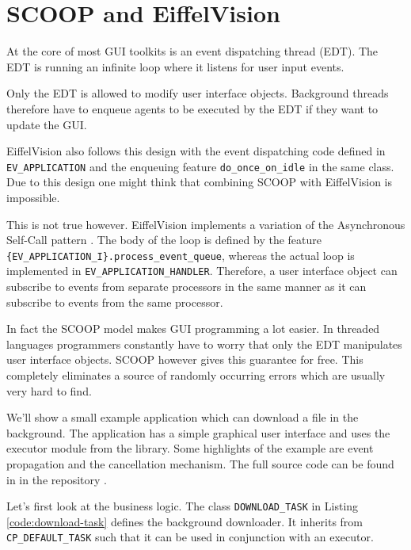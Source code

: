 \section{SCOOP and EiffelVision}

At the core of most GUI toolkits is an event dispatching thread (EDT).
The EDT is running an infinite loop where it listens for user input events.

Only the EDT is allowed to modify user interface objects.
Background threads therefore have to enqueue agents to be executed by the EDT if they want to update the GUI.

EiffelVision also follows this design with the event dispatching code defined in \lstinline!EV_APPLICATION! and the enqueuing feature \lstinline!do_once_on_idle! in the same class.
Due to this design one might think that combining SCOOP with EiffelVision is impossible.

This is not true however.
EiffelVision implements a variation of the Asynchronous Self-Call pattern .
The body of the loop is defined by the feature \lstinline!{EV_APPLICATION_I}.process_event_queue!, whereas the actual loop is implemented in \lstinline!EV_APPLICATION_HANDLER!.
Therefore, a user interface object can subscribe to events from separate processors in the same manner as it can subscribe to events from the same processor.

In fact the SCOOP model makes GUI programming a lot easier.
In threaded languages programmers constantly have to worry that only the EDT manipulates user interface objects.
SCOOP however gives this guarantee for free.
This completely eliminates a source of randomly occurring errors which are usually very hard to find.

We'll show a small example application which can download a file in the background.
The application has a simple graphical user interface and uses the executor module from the library.
Some highlights of the example are event propagation and the cancellation mechanism.
The full source code can be found in  in the repository \cite{web:repository}.

Let's first look at the business logic.
The class \lstinline!DOWNLOAD_TASK! in Listing \ref{code:download-task} defines the background downloader.
It inherits from \lstinline!CP_DEFAULT_TASK! such that it can be used in conjunction with an executor.

